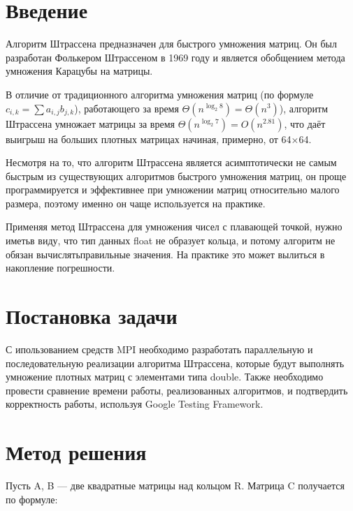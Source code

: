 \documentclass{report}
\begin{document}
\setcounter{page}{2}

\tableofcontents
\newpage

\section*{Введение}
Алгоритм Штрассена предназначен для быстрого умножения матриц. Он был разработан Фолькером Штрассеном в 1969 году и является обобщением метода умножения Карацубы на матрицы.

В отличие от традиционного алгоритма умножения матриц (по формуле ${\displaystyle c_{i,k}=\sum a_{i,j}b_{j,k}}$), работающего за время ${\displaystyle \Theta (n^{\log _{2}8})=\Theta (n^{3})}$), алгоритм Штрассена умножает матрицы за время ${\displaystyle \Theta (n^{\log _{2}7})=O(n^{2.81})}$, что даёт выигрыш на больших плотных матрицах начиная, примерно, от 64×64.

Несмотря на то, что алгоритм Штрассена является асимптотически не самым быстрым из существующих алгоритмов быстрого умножения матриц, он проще программируется и эффективнее при умножении матриц относительно малого размера, поэтому именно он чаще используется на практике. 

Применяя метод Штрассена для умножения чисел с плавающей точкой, нужно иметьв виду, что тип данных float не образует кольца, и потому алгоритм не обязан вычислятьправильные значения. На практике это может вылиться в накопление погрешности.
\newpage

\section*{Постановка задачи}
С ипользованием средств MPI необходимо разработать параллельную и последовательную реализации алгоритма Штрассена, которые будут выполнять умножение плотных матриц с элементами типа double. Также необходимо провести сравнение времени работы, реализованных алгоритмов, и подтвердить корректность работы, используя Google Testing Framework.
\newpage

\section*{Метод решения}
Пусть A, B — две квадратные матрицы над кольцом R. Матрица C получается по формуле:
\end{document}
